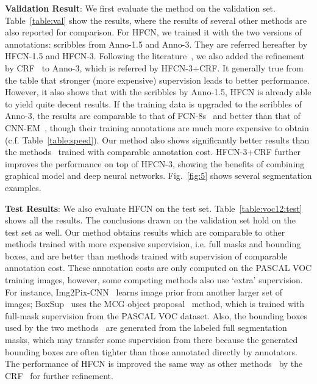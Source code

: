 \documentclass[runningheads]{llncs}
\makeatletter
\newcommand*{\ie}{i.e.\@\xspace}
\newcommand*{\cf}{c.f.\@\xspace}
\makeatother
\begin{document}
\textbf{Validation Result}: We first evaluate the method on the
validation set.  Table~\ref{table:val} show the results, where the
results of several other methods are also reported for comparison. For
HFCN, we trained it with the two versions of annotations: scribbles from
Anno-1.5 and Anno-3.  They are referred
hereafter by HFCN-1.5 and HFCN-3. 
Following the literature~\citep{rcnn_crf,ConsCNN}, we also added the refinement by CRF~\citep{fully-crf} to Anno-3, which is referred by HFCN-3+CRF.  It generally true from the table that stronger (more expensive) supervision leads to better
performance. However, it also shows that with the scribbles by
Anno-1.5, HFCN is already able to yield quite decent results. If the
training data is upgraded to the scribbles of Anno-3, the results are
comparable to that of FCN-8s~\citep{Long_2015_CVPR} and better than
that of CNN-EM~\citep{cnn:em}, though their training annotations are
much more expensive to obtain (\cf Table~\ref{table:speed}). Our
method also shows significantly better results than the
methods~\citep{whatpoint, ConsCNN} trained with comparable annotation
cost.  HFCN-3+CRF further improves the performance on top of HFCN-3, 
showing the benefits of combining graphical model and deep neural networks.   
Fig.~\ref{fig:5} shows several segmentation examples.


\textbf{Test Results}: We also evaluate HFCN on the test set. Table~\ref{table:voc12:test} shows
all the results. The conclusions drawn on the validation set hold on the test set as
well. Our method obtains results which are comparable to other methods
trained with more expensive supervision, \ie full masks and bounding
boxes, and are better than methods trained with supervision of
comparable annotation cost. These annotation costs are only computed
on the PASCAL VOC training images, however, some competing methods
also use `extra' supervision. For instance,
Img2Pix-CNN~\citep{img:pix:cnn} learns image prior from another larger
set of images; BoxSup~\citep{BoxSup} uses the MCG object
proposal~\citep{MCG} method, which is trained with full-mask
supervision from the PASCAL VOC dataset.  Also, the
bounding boxes used by the two methods~\citep{cnn:em, BoxSup} are
generated from the labeled full segmentation masks, which may transfer
some supervision from there because the generated bounding boxes are
often tighter than those annotated directly by annotators. 
The performance of HFCN is improved the same way as other
methods~\citep{rcnn_crf, cnn:em, ConsCNN} by  the
CRF~\citep{fully-crf} for further refinement. 
\end{document}
